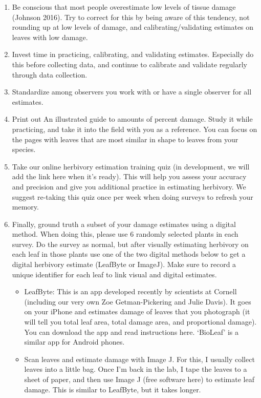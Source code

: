 \documentclass[
  letterpaper,
  oneside,
  open=any]{scrbook}
\begin{document}
\begin{enumerate}
\def\labelenumi{\arabic{enumi}.}
\item
  Be conscious that most people overestimate low levels of tissue damage
  (Johnson 2016). Try to correct for this by being aware of this
  tendency, not rounding up at low levels of damage, and
  calibrating/validating estimates on leaves with low damage.
\item
  Invest time in practicing, calibrating, and validating estimates.
  Especially do this before collecting data, and continue to calibrate
  and validate regularly through data collection.
\item
  Standardize among observers you work with or have a single observer
  for all estimates.
\item
  Print out An illustrated guide to amounts of percent damage. Study it
  while practicing, and take it into the field with you as a reference.
  You can focus on the pages with leaves that are most similar in shape
  to leaves from your species.
\item
  Take our online herbivory estimation training quiz (in development, we
  will add the link here when it's ready). This will help you assess
  your accuracy and precision and give you additional practice in
  estimating herbivory. We suggest re-taking this quiz once per week
  when doing surveys to refresh your memory.
\item
  Finally, ground truth a subset of your damage estimates using a
  digital method. When doing this, please use 6 randomly selected plants
  in each survey. Do the survey as normal, but after visually estimating
  herbivory on each leaf in those plants use one of the two digital
  methods below to get a digital herbivory estimate (LeafByte or
  ImageJ). Make sure to record a unique identifier for each leaf to link
  visual and digital estimates.

  \begin{itemize}
  \item
    LeafByte: This is an app developed recently by scientists at Cornell
    (including our very own Zoe Getman-Pickering and Julie Davis). It
    goes on your iPhone and estimates damage of leaves that you
    photograph (it will tell you total leaf area, total damage area, and
    proportional damage). You can download the app and read instructions
    here. `BioLeaf' is a similar app for Android phones.
  \item
    Scan leaves and estimate damage with Image J. For this, I usually
    collect leaves into a little bag. Once I'm back in the lab, I tape
    the leaves to a sheet of paper, and then use Image J (free software
    here) to estimate leaf damage. This is similar to LeafByte, but it
    takes longer.
  \end{itemize}
\end{enumerate}
\end{document}
